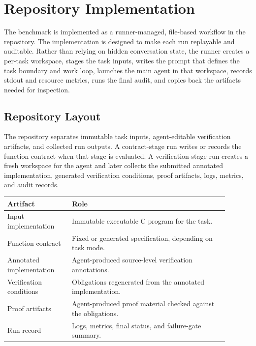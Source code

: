 \section{Repository Implementation}
\label{sec:implementation}

The benchmark is implemented as a runner-managed, file-based workflow in the repository. The implementation is designed to make each run replayable and auditable. Rather than relying on hidden conversation state, the runner creates a per-task workspace, stages the task inputs, writes the prompt that defines the task boundary and work loop, launches the main agent in that workspace, records stdout and resource metrics, runs the final audit, and copies back the artifacts needed for inspection.

\subsection{Repository Layout}

The repository separates immutable task inputs, agent-editable verification artifacts, and collected run outputs. A contract-stage run writes or records the function contract when that stage is evaluated. A verification-stage run creates a fresh workspace for the agent and later collects the submitted annotated implementation, generated verification conditions, proof artifacts, logs, metrics, and audit records.

\begin{center}
\small
\begin{tabular}{L{0.26\linewidth}L{0.63\linewidth}}
\toprule
\textbf{Artifact} & \textbf{Role} \\
\midrule
Input implementation & Immutable executable C program for the task. \\
Function contract & Fixed or generated specification, depending on task mode. \\
Annotated implementation & Agent-produced source-level verification annotations. \\
Verification conditions & Obligations regenerated from the annotated implementation. \\
Proof artifacts & Agent-produced proof material checked against the obligations. \\
Run record & Logs, metrics, final status, and failure-gate summary. \\
\bottomrule
\end{tabular}
\end{center}

